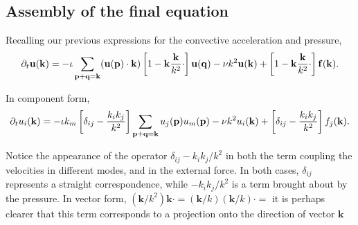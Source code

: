 \subsection{Assembly of the final equation}


Recalling our previous expressions for the convective acceleration and pressure,
\begin{equation*}
	\partial_t \mathbf{u} (\mathbf{k})  =
	- \iota  
	\sum_{ \mathbf{p} + \mathbf{q} = \mathbf{k}}
	(\mathbf{u}(\mathbf{p} ) \cdot \mathbf{k} )
	\left[ 
	1 - \mathbf{k} \frac{\mathbf{k} }{k^2} \cdot 
	\right]
	\mathbf{u}(\mathbf{q} )
	- \nu k^2 \mathbf{u}(\mathbf{k}) +
	\left[ 
	1 - \mathbf{k} \frac{\mathbf{k} }{k^2} \cdot 
	\right]
	\mathbf{f}(\mathbf{k}) .
\end{equation*}

In component form,
\begin{equation*}
	\partial_t u_i (\mathbf{k})  =
	- \iota  k_m
	\left[ 
	\delta_{ij} - \frac{k_i k_j  }{k^2}
	\right]
	\sum_{ \mathbf{p} + \mathbf{q} = \mathbf{k}}
	u_j(\mathbf{p} ) u_m(\mathbf{p} ) 
	- \nu k^2 u_i(\mathbf{k}) +
	\left[ 
	\delta_{ij} - \frac{k_i k_j }{k^2} 
	\right]
	f_j(\mathbf{k}) .
\end{equation*}

Notice the appearance of the operator \(  \delta_{ij} - k_i k_j  / k^2 \) in both the
term coupling the velocities in different modes, and in the external force. In both cases,
\(  \delta_{ij} \) represents a straight correspondence, while \(  - k_i k_j  / k^2 \)
is a term brought about by the pressure. In vector form, $(\mathbf{k} /k^2 ) \mathbf{k} \cdot =  (\mathbf{k} /k)  (\mathbf{k}/k) \cdot = $ it is perhaps clearer that this term corresponds to a projection onto the direction of vector $\mathbf{k}$

